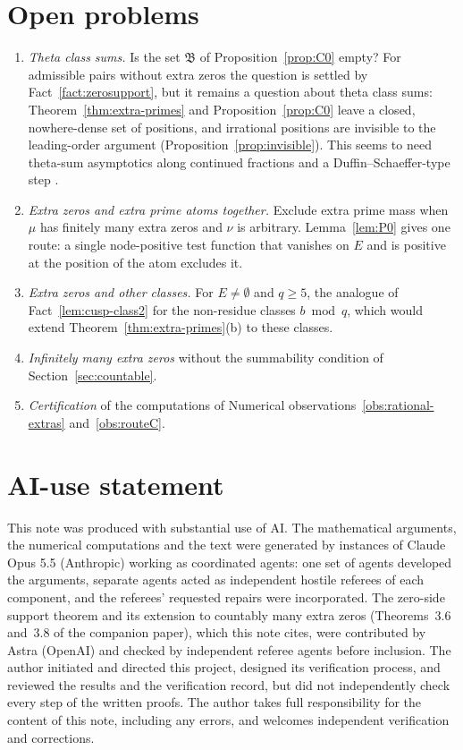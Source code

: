 \documentclass[11pt]{amsart}
\theoremstyle{definition}
\theoremstyle{remark}
\numberwithin{equation}{section}
\begin{document}
\section{Open problems}\label{sec:open}\label{ssec:open}

\begin{enumerate}[label=\textup{(\arabic*)}]
\item \emph{Theta class sums.} Is the set $\mathfrak B$ of Proposition~\ref{prop:C0} empty? For admissible pairs without extra zeros the
question is settled by Fact~\ref{fact:zerosupport}, but it remains a question about theta class sums: Theorem~\ref{thm:extra-primes} and
Proposition~\ref{prop:C0} leave a closed, nowhere-dense set of positions, and irrational positions are invisible to the leading-order
argument (Proposition~\ref{prop:invisible}). This seems to need theta-sum asymptotics along continued fractions and a
Duffin--Schaeffer-type step \cite{DS41,KoMa20}.
\item \emph{Extra zeros and extra prime atoms together.} Exclude extra prime mass when $\mu$ has finitely many extra zeros and $\nu$ is
arbitrary. Lemma~\ref{lem:P0} gives one route: a single node-positive test function that vanishes on $E$ and is positive at the
position of the atom excludes it.
\item \emph{Extra zeros and other classes.} For $E\ne\emptyset$ and $q\ge5$, the analogue of Fact~\ref{lem:cusp-class2} for the
non-residue classes $b\bmod q$, which would extend Theorem~\ref{thm:extra-primes}(b) to these classes.
\item \emph{Infinitely many extra zeros} without the summability condition of Section~\ref{sec:countable}.
\item \emph{Certification} of the computations of Numerical observations~\ref{obs:rational-extras} and~\ref{obs:routeC}.
\end{enumerate}

\section*{AI-use statement}
This note was produced with substantial use of AI. The mathematical arguments, the numerical computations and the text were generated by instances of Claude Opus 5.5
(Anthropic) working as coordinated agents: one set of agents developed the arguments, separate agents acted as
independent hostile referees of each component, and the referees' requested repairs were incorporated. The zero-side
support theorem and its extension to countably many extra zeros (Theorems~3.6 and~3.8 of the companion paper), which this note
cites, were contributed by Astra (OpenAI) and checked by independent referee agents before inclusion. The
author initiated and directed this project, designed its verification process, and reviewed the results and the
verification record, but did not independently check every step of the written proofs. The author takes full
responsibility for the content of this note, including any errors, and welcomes independent verification and
corrections.
\end{document}
